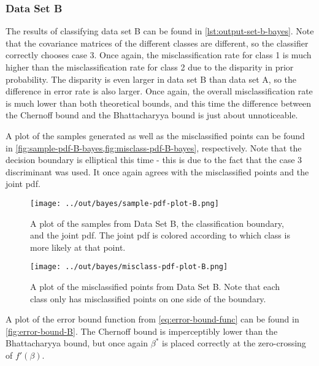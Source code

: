 \documentclass[headings=optiontoheadandtoc,listof=totoc,parskip=full]{scrartcl}
\begin{document}
\subsubsection{Data Set B}

The results of classifying data set B can be found in \cref{lst:output-set-b-bayes}. Note that the covariance matrices of the different classes are different, so the classifier correctly chooses case 3. Once again, the misclassification rate for class 1 is much higher than the misclassification rate for class 2 due to the disparity in prior probability. The disparity is even larger in data set B than data set A, so the difference in error rate is also larger. Once again, the overall misclassification rate is much lower than both theoretical bounds, and this time the difference between the Chernoff bound and the Bhattacharyya bound is just about unnoticeable.



A plot of the samples generated as well as the misclassified points can be found in \cref{fig:sample-pdf-B-bayes,fig:misclass-pdf-B-bayes}, respectively. Note that the decision boundary is elliptical this time - this is due to the fact that the case 3 discriminant was used. It once again agrees with the misclassified points and the joint pdf.

\begin{figure}[H]
	\centering
	\texttt{[image: ../out/bayes/sample-pdf-plot-B.png]}
	\caption{A plot of the samples from Data Set B, the classification boundary, and the joint pdf. The joint pdf is colored according to which class is more likely at that point.}
	\label{fig:sample-pdf-B-bayes}
\end{figure}


\begin{figure}[H]
	\centering
	\texttt{[image: ../out/bayes/misclass-pdf-plot-B.png]}
	\caption{A plot of the misclassified points from Data Set B. Note that each class only has misclassified points on one side of the boundary.}
	\label{fig:misclass-pdf-B-bayes}
\end{figure}

A plot of the error bound function from \cref{eq:error-bound-func} can be found in \cref{fig:error-bound-B}. The Chernoff bound is imperceptibly lower than the Bhattacharyya bound, but once again $\beta^*$ is placed correctly at the zero-crossing of $f'(\beta)$.
\end{document}
